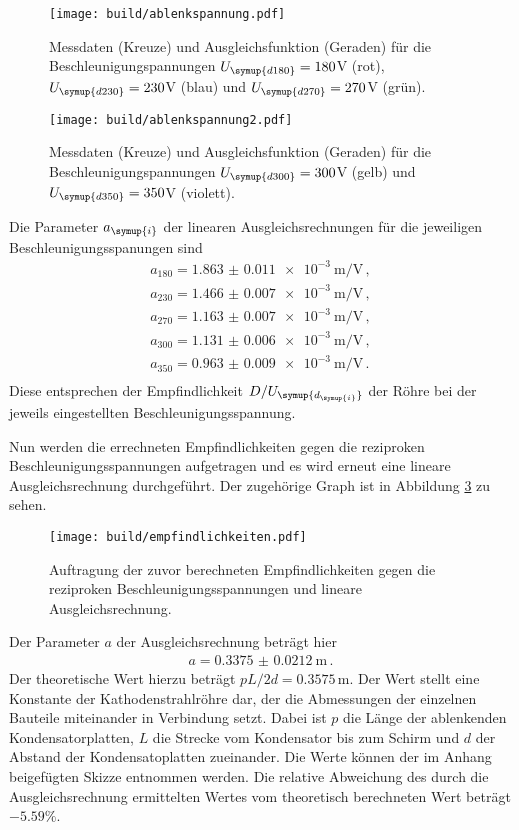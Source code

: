 \begin{figure}[]
  \centering
  \texttt{[image: build/ablenkspannung.pdf]}
  \caption{Messdaten (Kreuze) und Ausgleichsfunktion (Geraden) für die Beschleunigungspannungen
  $U_{\symup{d180}}=180$V (rot), $U_{\symup{d230}}=230$V (blau) und $U_{\symup{d270}}=270$V (grün).}
  \label{fig:ablenkspannung}
\end{figure}

\begin{figure}[]
  \centering
  \texttt{[image: build/ablenkspannung2.pdf]}
  \caption{Messdaten (Kreuze) und Ausgleichsfunktion (Geraden) für die Beschleunigungspannungen
  $U_{\symup{d300}}=300$V (gelb) und $U_{\symup{d350}}=350$V (violett).}
  \label{fig:ablenkspannung2}
\end{figure}

Die Parameter $a_{\symup{i}}$ der linearen Ausgleichsrechnungen für die jeweiligen
Beschleunigungsspanungen sind
\begin{align*}
  a_{180} = \SI{1.863(0011)e-3}{\meter\per\volt} \,, \\
  a_{230} = \SI{1.466(0007)e-3}{\meter\per\volt}  \,, \\
  a_{270} = \SI{1.163(0007)e-3}{\meter\per\volt}  \,,\\
  a_{300} = \SI{1.131(0006)e-3}{\meter\per\volt}  \,,\\
  a_{350} = \SI{0.963(0009)e-3}{\meter\per\volt} \,.\\
\end{align*}
Diese entsprechen der Empfindlichkeit $D/U_{\symup{d_{\symup{i}}}}$ der Röhre bei
der jeweils eingestellten Beschleunigungsspannung.

Nun werden die errechneten Empfindlichkeiten gegen die reziproken Beschleunigungsspannungen
aufgetragen und es wird erneut eine lineare Ausgleichsrechnung durchgeführt. Der
zugehörige Graph ist in Abbildung \ref{fig:empfindlichkeiten} zu sehen.

\begin{figure}[]
  \centering
  \texttt{[image: build/empfindlichkeiten.pdf]}
  \caption{Auftragung der zuvor berechneten Empfindlichkeiten gegen die reziproken
  Beschleunigungsspannungen und lineare Ausgleichsrechnung.}
  \label{fig:empfindlichkeiten}
\end{figure}

Der Parameter $a$ der Ausgleichsrechnung beträgt hier
\begin{align*}
  a=\SI{0.3375(00212)}{\meter} \,.
\end{align*}
Der theoretische Wert hierzu beträgt $pL/2d=0.3575\,$m. Der Wert stellt eine
Konstante der Kathodenstrahlröhre dar, der die Abmessungen der einzelnen Bauteile
miteinander in Verbindung setzt. Dabei ist $p$ die
Länge der ablenkenden Kondensatorplatten, $L$ die Strecke vom Kondensator bis zum
Schirm und $d$ der Abstand der Kondensatoplatten zueinander. Die Werte können der
im Anhang beigefügten Skizze entnommen werden. Die relative Abweichung
des durch die Ausgleichsrechnung ermittelten Wertes vom theoretisch berechneten Wert
beträgt $-5.59\%$.



